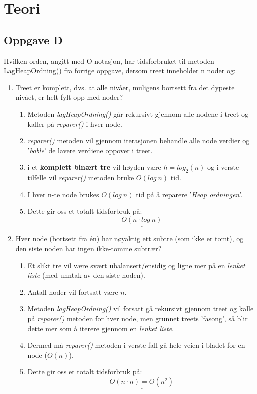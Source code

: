 \chapter{Teori}
\label{chap:intro}

\section{Oppgave D}

Hvilken orden, angitt med O-notasjon, har tidsforbruket til metoden LagHeapOrdning() fra forrige oppgave, dersom treet inneholder n noder og:

\begin{enumerate}[label=\alph*)]
	\item Treet er komplett, dvs. at alle nivåer, muligens bortsett fra det dypeste nivået, er helt fylt opp med noder?
	\begin{enumerate}[label=$\cdot$]
		\item Metoden \textit{lagHeapOrdning()} går rekursivt gjennom alle nodene i treet og kaller på \textit{reparer()} i hver node.
		\item \textit{reparer()} metoden vil gjennom iterasjonen behandle alle node verdier og '\textit{boble}' de lavere verdiene oppover i treet.
		\item i et \textbf{komplett binært tre} vil høyden være $h=log_2(n)$ og i verste tilfelle vil \textit{reparer()} metoden bruke $O(log\ n)$ tid.
		\item I hver n-te node brukes $O(log\ n)$ tid på å reparere '\textit{Heap ordningen}'.
		\item Dette gir oss et totalt tidsforbruk på:
		\[
			\underline{\underline{O(n\cdot log\ n)}}
		\]
	\end{enumerate}
	
	\item Hver node (bortsett fra én) har nøyaktig ett subtre (som ikke er tomt), og den siste noden har ingen ikke-tomme subtrær?
	\begin{enumerate}[label=$\cdot$]
		\item Et slikt tre vil være svært ubalansert/ensidig og ligne mer på en \textit{lenket liste} (med unntak av den siste noden).
		\item Antall noder vil fortsatt være $n$.
		\item Metoden \textit{lagHeapOrdning()} vil forsatt gå rekursivt gjennom treet og kalle på \textit{reparer()} metoden for hver node, men grunnet treets 'fasong', så blir dette mer som å iterere gjennom en \textit{lenket liste}.
		\item Dermed må \textit{reparer()} metoden i verste fall gå hele veien i bladet for en node ($O(n)$).
		\item Dette gir oss et totalt tidsforbruk på:
		\[
			\underline{\underline{O(n\cdot n)=O(n^2)}}
		\]
	\end{enumerate}
\end{enumerate}
